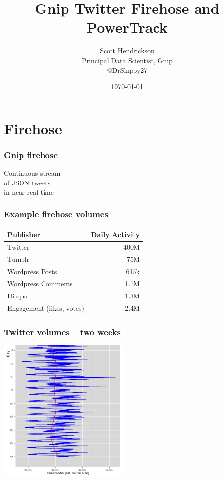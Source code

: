 \documentclass{beamer}
\begin{document}
\title{Gnip Twitter Firehose and PowerTrack}
\author{Scott Hendrickson \\ Principal Data Scientist, Gnip \\  @DrSkippy27}
\date{\today} 


\begin{frame}
\titlepage
\end{frame}


\section{Firehose}

\begin{frame}\frametitle{Gnip firehose}
\begin{center}
{\Large Continuous stream \\ [10pt] of JSON tweets \\ [15pt] in near-real time}
\end{center}
\end{frame}


\begin{frame} \frametitle{Example firehose volumes}
\begin{table}
\begin{tabular}{l|r}
\hline
   {Publisher}   &   {Daily Activity}   \\
\hline 
    Twitter      &      400M   \\
    Tumblr      &        75M   \\
    Wordpress Posts &     615k   \\
    Wordpress Comments & 1.1M \\
    Disqus       &       1.3M  \\
    Engagement (likes, votes) & 2.4M  \\
\hline
\end{tabular}
\end{table}
\end{frame}

\begin{frame}\frametitle{Twitter volumes -- two weeks}
  \begin{center}
    \includegraphics[width=6.5cm]{./imgs/tweets.png}
  \end{center}
\end{frame}
\end{document}
